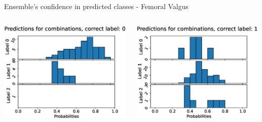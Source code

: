 \begin{frame}[fragile]{Ensemble's confidence in predicted classes - Femoral Valgus}
  \begin{columns}[T,onlytextwidth]
      \includegraphics[width=\textwidth]{files/figs/res/femval/pc0.eps}

      \includegraphics[width=\textwidth]{files/figs/res/femval/pc1.eps}


\end{columns}
\end{frame}
